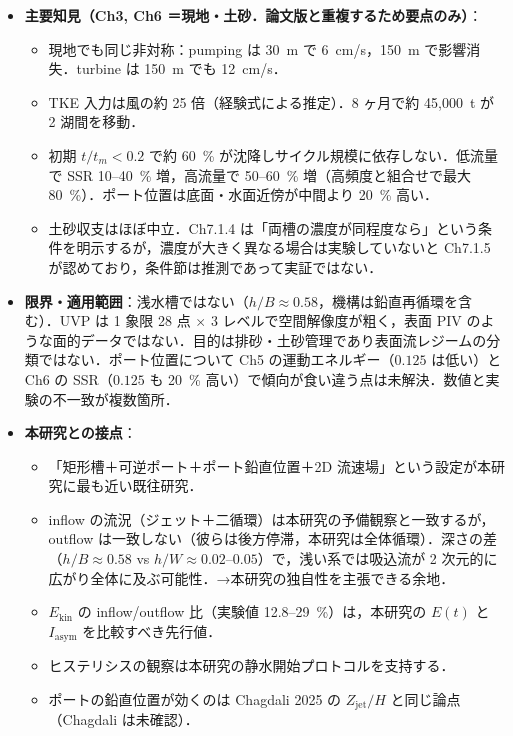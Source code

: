 \documentclass[11pt]{jsarticle}
\begin{document}
\begin{itemize}
\begin{itemize}
    \item ヒステリシス：outflow の流況はしばしば先行 inflow に影響され，大きな再循環セルは散逸まで持続．高頻度ほど残留セルによりエネルギー入力が増す．散逸所要は $Q = 1.1$ で $0.8\,t_{P,\mathrm{IN}}$，$Q = 0.3$ で $0.2\,t_{P,\mathrm{IN}}$．→本研究が各 run を静水から始め $E(t)$ で残留判定する設計の直接の根拠．
    \item ジェット偏向は $z_i/B = 0.125$ と $0.375$ で発生（$0.25$ では起きない）．数値でも再現され，原因は overflow section による幾何的非対称と説明．
    \item 底層（$z/B = 0.125$）で $Q > 0.7$~L/s のとき取水口へ向かう backflow．
  \end{itemize}
  \item \textbf{主要知見（Ch3, Ch6 ＝現地・土砂．論文版と重複するため要点のみ）}：
  \begin{itemize}
    \item 現地でも同じ非対称：pumping は 30~m で 6~cm/s，150~m で影響消失．turbine は 150~m でも 12~cm/s．
    \item TKE 入力は風の約 25 倍（経験式による推定）．8 ヶ月で約 45{,}000~t が 2 湖間を移動．
    \item 初期 $t/t_m < 0.2$ で約 60~\% が沈降しサイクル規模に依存しない．低流量で SSR 10--40~\% 増，高流量で 50--60~\% 増（高頻度と組合せで最大 80~\%）．ポート位置は底面・水面近傍が中間より 20~\% 高い．
    \item 土砂収支はほぼ中立．Ch7.1.4 は「両槽の濃度が同程度なら」という条件を明示するが，濃度が大きく異なる場合は実験していないと Ch7.1.5 が認めており，条件節は推測であって実証ではない．
  \end{itemize}
  \item \textbf{限界・適用範囲}：浅水槽ではない（$h/B \approx 0.58$，機構は鉛直再循環を含む）．UVP は 1 象限 28 点 $\times$ 3 レベルで空間解像度が粗く，表面 PIV のような面的データではない．目的は排砂・土砂管理であり表面流レジームの分類ではない．ポート位置について Ch5 の運動エネルギー（$0.125$ は低い）と Ch6 の SSR（$0.125$ も 20~\% 高い）で傾向が食い違う点は未解決．数値と実験の不一致が複数箇所．
  \item \textbf{本研究との接点}：
  \begin{itemize}
    \item 「矩形槽＋可逆ポート＋ポート鉛直位置＋2D 流速場」という設定が本研究に最も近い既往研究．
    \item inflow の流況（ジェット＋二循環）は本研究の予備観察と一致するが，outflow は一致しない（彼らは後方停滞，本研究は全体循環）．深さの差（$h/B \approx 0.58$ vs $h/W \approx 0.02$--$0.05$）で，浅い系では吸込流が 2 次元的に広がり全体に及ぶ可能性．→本研究の独自性を主張できる余地．
    \item $E_\mathrm{kin}$ の inflow/outflow 比（実験値 12.8--29~\%）は，本研究の $E(t)$ と $I_\mathrm{asym}$ を比較すべき先行値．
    \item ヒステリシスの観察は本研究の静水開始プロトコルを支持する．
    \item ポートの鉛直位置が効くのは Chagdali 2025 の $Z_\mathrm{jet}/H$ と同じ論点（Chagdali は未確認）．
  \end{itemize}
\end{itemize}
\end{document}
